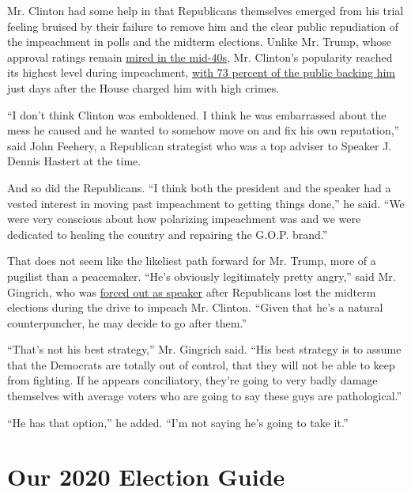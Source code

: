Mr. Clinton had some help in that Republicans themselves emerged from
his trial feeling bruised by their failure to remove him and the clear
public repudiation of the impeachment in polls and the midterm
elections. Unlike Mr. Trump, whose approval ratings remain
\href{https://projects.fivethirtyeight.com/trump-approval-ratings/?ex_cid=rrpromo}{mired
in the mid-40s}, Mr. Clinton's popularity reached its highest level
during impeachment,
\href{https://news.gallup.com/poll/116584/presidential-approval-ratings-bill-clinton.aspx}{with
73 percent of the public backing him} just days after the House charged
him with high crimes.

``I don't think Clinton was emboldened. I think he was embarrassed about
the mess he caused and he wanted to somehow move on and fix his own
reputation,'' said John Feehery, a Republican strategist who was a top
adviser to Speaker J. Dennis Hastert at the time.

And so did the Republicans. ``I think both the president and the speaker
had a vested interest in moving past impeachment to getting things
done,'' he said. ``We were very conscious about how polarizing
impeachment was and we were dedicated to healing the country and
repairing the G.O.P. brand.''

That does not seem like the likeliest path forward for Mr. Trump, more
of a pugilist than a peacemaker. ``He's obviously legitimately pretty
angry,'' said Mr. Gingrich, who was
\href{https://www.nytimes.com/1998/11/07/us/speaker-steps-down-overview-facing-revolt-gingrich-won-t-run-for-speaker-will.html}{forced
out as speaker} after Republicans lost the midterm elections during the
drive to impeach Mr. Clinton. ``Given that he's a natural
counterpuncher, he may decide to go after them.''

``That's not his best strategy,'' Mr. Gingrich said. ``His best strategy
is to assume that the Democrats are totally out of control, that they
will not be able to keep from fighting. If he appears conciliatory,
they're going to very badly damage themselves with average voters who
are going to say these guys are pathological.''

``He has that option,'' he added. ``I'm not saying he's going to take
it.''

\hypertarget{our-2020-election-guide}{%
\section{Our 2020 Election Guide}\label{our-2020-election-guide}}


